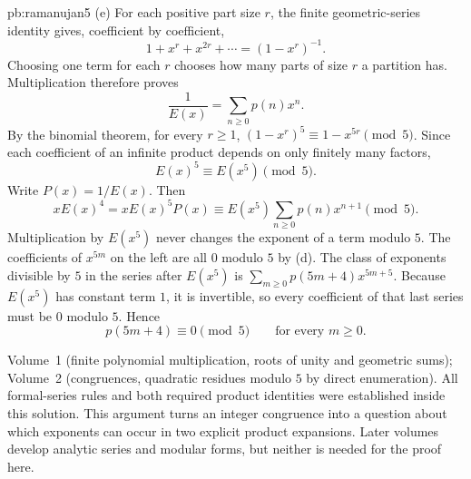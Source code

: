 \begin{solution}{pb:ramanujan5}
(e) For each positive part size $r$,
the finite geometric-series identity gives,
coefficient by coefficient,
\[
1+x^r+x^{2r}+\cdots=(1-x^r)^{-1}.
\]
Choosing one term for each $r$ chooses how
many parts of size $r$ a partition has.
Multiplication therefore proves
\[
\frac1{E(x)}=\sum_{n\ge0}p(n)x^n.
\]
By the binomial theorem, for every $r\ge1$,
$(1-x^r)^5\equiv1-x^{5r}\pmod5$.
Since each coefficient of an infinite product
depends on only finitely many factors,
\[
E(x)^5\equiv E(x^5)\pmod5.
\]
Write $P(x)=1/E(x)$. Then
\[
xE(x)^4=xE(x)^5P(x)
\equiv E(x^5)\sum_{n\ge0}p(n)x^{n+1}
\pmod5.
\]
Multiplication by $E(x^5)$ never changes
the exponent of a term modulo $5$.
The coefficients of $x^{5m}$ on the left
are all $0$ modulo $5$ by (d).
The class of exponents divisible by $5$
in the series after $E(x^5)$ is
$\sum_{m\ge0}p(5m+4)x^{5m+5}$.
Because $E(x^5)$ has constant term $1$,
it is invertible, so every coefficient
of that last series must be $0$ modulo $5$.
Hence
\[
p(5m+4)\equiv0\pmod5
\qquad\text{for every }m\ge0.
\]

\tools Volume~1 (finite polynomial multiplication, roots
of unity and geometric sums); Volume~2 (congruences,
quadratic residues modulo $5$ by direct enumeration).
All formal-series rules and both required product
identities were established inside this solution.
\leads This argument turns an integer congruence into
a question about which exponents can occur in two
explicit product expansions. Later volumes develop
analytic series and modular forms, but neither is
needed for the proof here.
\end{solution}

